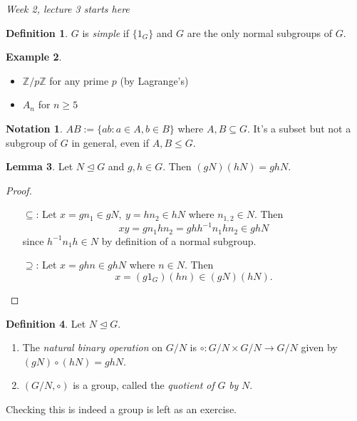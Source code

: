 \documentclass[a4paper]{article}
\newcommand{\Z}{\mathbb{Z}}
\theoremstyle{definition}
\newtheorem{defn}{Definition}[subsection]
\newtheorem{lemma}[defn]{Lemma}
\newtheorem{example}[defn]{Example}
\newtheorem*{notation}{Notation}
\begin{document}
\begin{flushright}
\textit{Week 2, lecture 3 starts here}
\end{flushright}

\begin{defn}
$G$ is \textit{simple} if $\{1_G\}$ and $G$ are the only normal subgroups of $G$.
\end{defn}
\begin{example}
\begin{itemize}
\item $\Z/p\Z$ for any prime $p$ (by Lagrange's)
\item $A_n$ for $n\geq 5$
\end{itemize}
\end{example}
\begin{notation}
$AB:=\{ab:a\in A,b\in B\}$ where $A,B\subseteq G$. It's a subset but not a subgroup of $G$ in general, even if $A,B\leq G$.
\end{notation}
\begin{lemma}
Let $N\unlhd G$ and $g,h\in G$. Then $(gN)(hN)=ghN$.
\end{lemma}
\begin{proof}
\begin{itemize}
\item[$\subseteq$:] Let $x=gn_1\in gN,\ y=hn_2\in hN$ where $n_{1,2}\in N$. Then
\[
xy=gn_1hn_2=ghh^{-1}n_1hn_2 \in ghN
\]
since $h^{-1}n_1h\in N$ by definition of a normal subgroup.
\item[$\supseteq$:] Let $x=ghn\in ghN$ where $n\in N$. Then
\[
x=(g1_G)(hn)\in (gN)(hN).
\]
\end{itemize}
\end{proof}
\begin{defn}
Let $N\unlhd G$.
\begin{enumerate}
\item The \textit{natural binary operation} on $G/N$ is $\circ:G/N\times G/N\rightarrow G/N$ given by $(gN)\circ(hN)=ghN$.
\item $(G/N,\circ)$ is a group, called the \textit{quotient of} $G$ \textit{by} $N$.
\end{enumerate}
\end{defn}
Checking this is indeed a group is left as an exercise.
\end{document}
